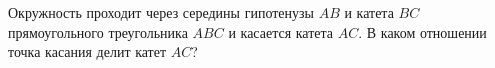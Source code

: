 \begin{ex}
	\begin{condition}
		Окружность проходит через середины гипотенузы \( AB \) и катета \( BC  \) прямоугольного треугольника \( ABC  \) и касается катета \( AC \). В каком отношении точка касания делит катет \( AC \)?
	\end{condition}
\end{ex}